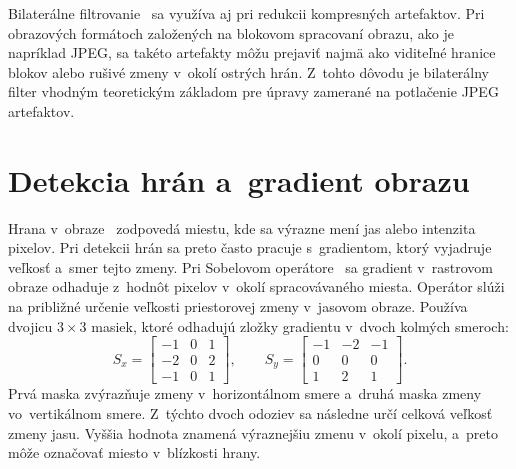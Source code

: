 Bilaterálne filtrovanie~\cite{zhang} sa využíva aj pri redukcii kompresných artefaktov. Pri obrazových formátoch založených na blokovom spracovaní obrazu, ako je napríklad JPEG, sa takéto artefakty môžu prejaviť najmä ako viditeľné hranice blokov alebo rušivé zmeny v~okolí ostrých hrán. Z~tohto dôvodu je bilaterálny filter vhodným teoretickým základom pre úpravy zamerané na potlačenie JPEG artefaktov.

\section{Detekcia hrán a~gradient obrazu}
\label{sec:edges_gradient}

Hrana v~obraze~\cite{canny} zodpovedá miestu, kde sa výrazne mení jas alebo intenzita pixelov. Pri detekcii hrán sa preto často pracuje s~gradientom, ktorý vyjadruje veľkosť a~smer tejto zmeny. Pri Sobelovom operátore~\cite{hiprsobel} sa gradient v~rastrovom obraze odhaduje z~hodnôt pixelov v~okolí spracovávaného miesta. Operátor slúži na približné určenie veľkosti priestorovej zmeny v~jasovom obraze. Používa dvojicu \(3 \times 3\) masiek, ktoré odhadujú zložky gradientu v~dvoch kolmých smeroch:
\begin{equation}
    S_x=
    \begin{bmatrix}
        -1 & 0 & 1\\
        -2 & 0 & 2\\
        -1 & 0 & 1
    \end{bmatrix},
    \qquad
    S_y=
    \begin{bmatrix}
        -1 & -2 & -1\\
         0 &  0 &  0\\
         1 &  2 &  1
    \end{bmatrix}.
\end{equation}
Prvá maska zvýrazňuje zmeny v~horizontálnom smere a~druhá maska zmeny vo~vertikálnom smere. Z~týchto dvoch odoziev sa následne určí celková veľkosť zmeny jasu. Vyššia hodnota znamená výraznejšiu zmenu v~okolí pixelu, a~preto môže označovať miesto v~blízkosti hrany.

